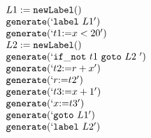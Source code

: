 \documentclass{jarticle}
\begin{document}
\[
 \begin{array}{l}
    L1:=\makenewlabel\\
    \genlabel{L1}\\
    \genassign{t1}{x<20}\\
    L2:=\makenewlabel\\
    \genifnot{t1}{L2}\\
    \genassign{t2}{r+x}\\
    \genassign{r}{t2}\\
    \genassign{t3}{x+1}\\
    \genassign{x}{t3}\\
    \gengoto{L1}\\
    \genlabel{L2}
 \end{array}
\]
\end{document}
